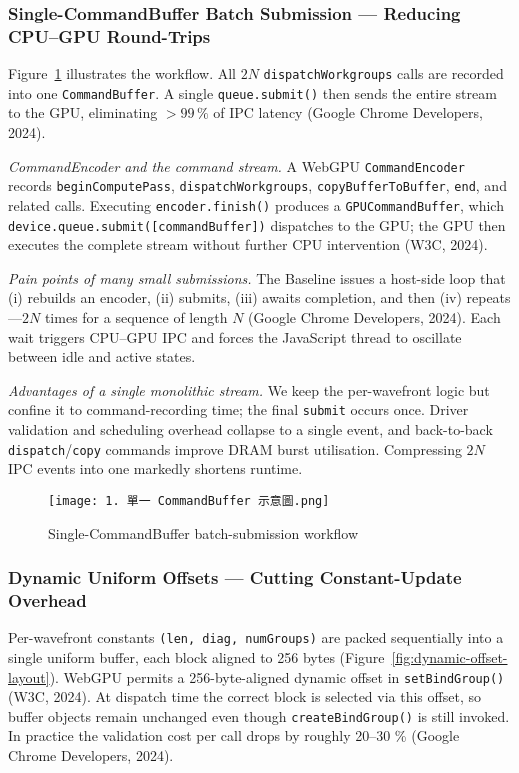 \documentclass[PhD]{PHlab-thesis}
\begin{document}
\subsubsection{Single-CommandBuffer Batch Submission — Reducing CPU–GPU Round-Trips}
Figure~\ref{fig:scb-batch-workflow} illustrates the workflow. All $2N$ \texttt{dispatchWorkgroups} calls are recorded into one \texttt{CommandBuffer}. A single \texttt{queue.submit()} then sends the entire stream to the GPU, eliminating \(>\!99\,\%\) of IPC latency (Google Chrome Developers, 2024).

\textit{CommandEncoder and the command stream.}  
A WebGPU \texttt{CommandEncoder} records \texttt{beginComputePass}, \texttt{dispatchWorkgroups}, \texttt{copyBufferToBuffer}, \texttt{end}, and related calls. Executing \texttt{encoder.finish()} produces a \texttt{GPUCommandBuffer}, which \texttt{device.queue.submit([commandBuffer])} dispatches to the GPU; the GPU then executes the complete stream without further CPU intervention (W3C, 2024).

\textit{Pain points of many small submissions.}  
The Baseline issues a host-side loop that (i) rebuilds an encoder, (ii) submits, (iii) awaits completion, and then (iv) repeats—\(2N\) times for a sequence of length \(N\) (Google Chrome Developers, 2024). Each wait triggers CPU–GPU IPC and forces the JavaScript thread to oscillate between idle and active states.

\textit{Advantages of a single monolithic stream.}  
We keep the per-wavefront logic but confine it to command-recording time; the final \texttt{submit} occurs once. Driver validation and scheduling overhead collapse to a single event, and back-to-back \texttt{dispatch}/\texttt{copy} commands improve DRAM burst utilisation. Compressing \(2N\) IPC events into one markedly shortens runtime.

\begin{figure}[htbp]
  \centering
  \texttt{[image: 1. 單一 CommandBuffer 示意圖.png]}
  \caption{Single-CommandBuffer batch-submission workflow}
  \label{fig:scb-batch-workflow}
\end{figure}

\subsubsection{Dynamic Uniform Offsets — Cutting Constant-Update Overhead}
Per-wavefront constants \texttt{(len, diag, numGroups)} are packed sequentially into a single uniform buffer, each block aligned to 256 bytes (Figure~\ref{fig:dynamic-offset-layout}). WebGPU permits a 256-byte-aligned dynamic offset in \texttt{setBindGroup()} (W3C, 2024). At dispatch time the correct block is selected via this offset, so buffer objects remain unchanged even though \texttt{createBindGroup()} is still invoked. In practice the validation cost per call drops by roughly 20–30 \% (Google Chrome Developers, 2024).
\end{document}
